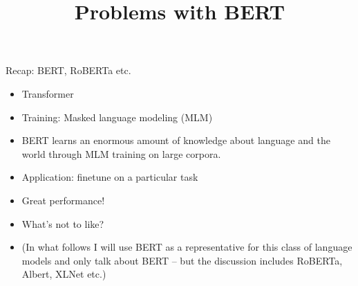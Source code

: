



\newcommand{\learninggoals}{
\item Recap BERT-like models
\item Understand problems models following this paradigm have}
\def\myblue#1{\textcolor{texblue}{#1}}

\title{Problems with BERT}
\date{}




\begin{vbframe}{Recap: BERT, RoBERTa etc.}

\vfill

  \begin{itemize}
\item Transformer
\item Training: Masked language modeling (MLM)
\item BERT learns an enormous amount of knowledge
about language and the world through MLM training on large corpora.
\item Application: finetune on a particular task
\item Great performance!
\item What's not to like?
\item (In what follows I will use BERT as a
representative for this class of language models and only
talk about BERT -- but the discussion includes RoBERTa,
Albert, XLNet etc.)
    \end{itemize}

\vfill

\end{vbframe}


